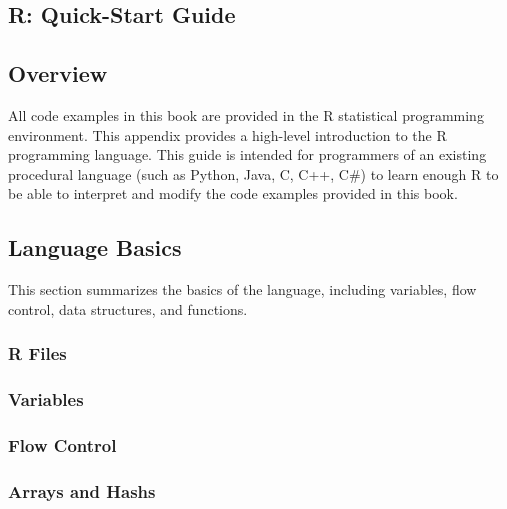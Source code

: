 


\renewcommand{\chaptermark}[1]{\markboth{\thechapter.\ #1}{}}
\begin{bibunit}
\chapter{R: Quick-Start Guide}
\label{ch:appendix1}

\section{Overview}
All code examples in this book are provided in the R statistical programming environment.
This appendix provides a high-level introduction to the R programming language. This guide is intended for programmers of an existing procedural language (such as Python, Java, C, C++, C\#) to learn enough R to be able to interpret and modify the code examples provided in this book.

\section{Language Basics}
This section summarizes the basics of the language, including variables, flow control, data structures, and functions.

\subsection{R Files}

\subsection{Variables}


\subsection{Flow Control}

\subsection{Arrays and Hashs}


\end{bibunit}
